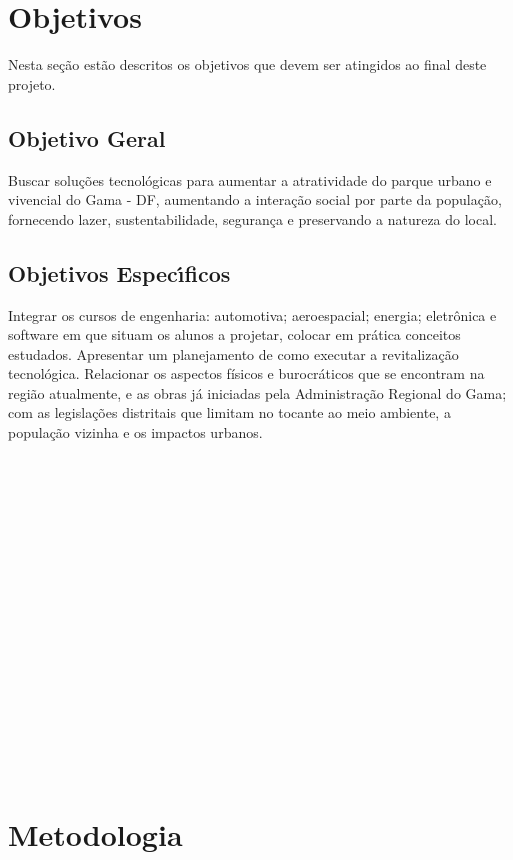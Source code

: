 \section{Objetivos}

Nesta se\c{c}\~ao est\~ao descritos os objetivos que devem ser atingidos ao final deste projeto.

\subsection{Objetivo Geral}

Buscar solu\c{c}\~oes tecnol\'ogicas para aumentar a atratividade do parque urbano e vivencial do Gama - DF, aumentando a intera\c{c}\~ao social por parte da popula\c{c}\~ao, fornecendo lazer, sustentabilidade, seguran\c{c}a e preservando a natureza do local. 

\subsection{Objetivos Espec\'{\i}ficos}

Integrar os cursos de engenharia: automotiva; aeroespacial; energia; eletr\^onica e software em que situam os alunos a projetar, colocar em pr\'atica conceitos estudados. 
Apresentar um planejamento de como executar a revitaliza\c{c}\~ao tecnol\'ogica. Relacionar os aspectos f\'isicos e burocr\'aticos que se encontram na regi\~ao atualmente, e as obras j\'a iniciadas pela Administra\c{c}\~ao Regional do Gama; com as legisla\c{c}\~oes distritais que limitam no tocante ao meio ambiente, a popula\c{c}\~ao vizinha e os impactos urbanos. \\ \\ \\ \\ \\ \\ \\ \\ \\ \\ \\ \\ \\ \\ \\ \\ \\ \\

\section{Metodologia}

